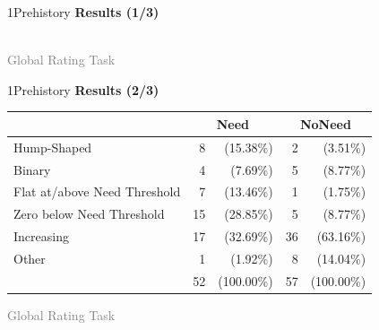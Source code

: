 \documentclass[xcolor=table,9pt,aspectratio=169]{beamer}
\begin{document}
\begin{frame}{\vspace*{10mm}1\hspace*{1em}Prehistory}
   \textbf{Results (1/3)}
   \begin{center}
      \\
      \textcolor{gray}{Global Rating Task}
   \end{center}
\end{frame}


\begin{frame}{\vspace*{10mm}1\hspace*{1em}Prehistory}
   \textbf{Results (2/3)}
   
   \medskip
   \begin{center}
      \begin{tabular}{lrrrr}
         \arrayrulecolor{blue2}\hline
                                        & \multicolumn{2}{c}{Need}   & \multicolumn{2}{c}{NoNeed}   \\
         \hline\hline
         Hump-Shaped                    &  8   &  (15.38\%)          &  2   &   (3.51\%)            \\
         Binary                         &  4   &   (7.69\%)          &  5   &   (8.77\%)            \\
         Flat at/above Need Threshold   &  7   &  (13.46\%)          &  1   &   (1.75\%)            \\
         Zero below Need Threshold      & 15   &  (28.85\%)          &  5   &   (8.77\%)            \\
         Increasing                     & 17   &  (32.69\%)          & 36   &  (63.16\%)            \\
         Other                          &  1   &   (1.92\%)          &  8   &  (14.04\%)            \\
         \hline
                                        & 52   & (100.00\%)          & 57   & (100.00\%)            \\
         \hline
      \end{tabular}
      
      \medskip
      \textcolor{gray}{Global Rating Task}
   \end{center}
\end{frame}
\end{document}
